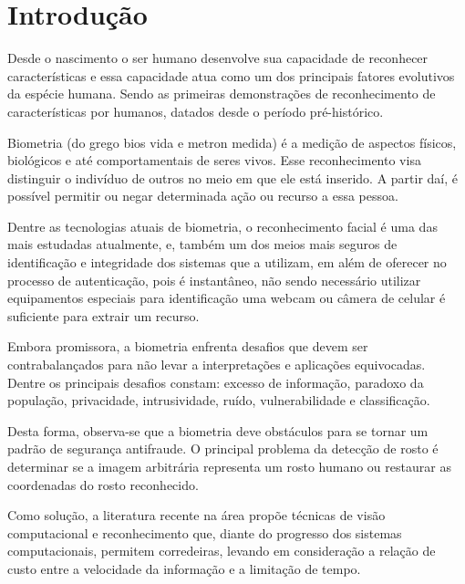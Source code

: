 
\chapter{Introdução}\label{cap:introducao}

Desde o nascimento o ser humano desenvolve sua capacidade de reconhecer características e essa capacidade atua como um dos principais fatores evolutivos da espécie humana. Sendo as primeiras demonstrações de reconhecimento de características por humanos, datados desde o período pré-histórico.

Biometria (do grego bios vida e metron medida) é a medição de aspectos físicos, biológicos e até comportamentais de seres vivos. Esse reconhecimento visa distinguir o indivíduo de outros no meio em que ele está inserido. A partir daí, é possível permitir ou negar determinada ação ou recurso a essa pessoa.

Dentre as tecnologias atuais de biometria, o reconhecimento facial é uma das mais estudadas atualmente, e, também um dos meios mais seguros de identificação e integridade dos sistemas que a utilizam, em além de oferecer no processo de autenticação, pois é instantâneo, não sendo necessário utilizar equipamentos especiais para identificação uma webcam ou câmera de celular é suficiente para extrair um recurso.

Embora promissora, a biometria enfrenta desafios que devem ser contrabalançados para não levar a interpretações e aplicações equivocadas. Dentre os principais desafios constam: excesso de informação, paradoxo da população, privacidade, intrusividade, ruído, vulnerabilidade e classificação.

Desta forma, observa-se que a biometria deve obstáculos para se tornar um padrão de segurança antifraude. O principal problema da detecção de rosto é determinar se a imagem arbitrária representa um rosto humano ou restaurar as coordenadas do rosto reconhecido.

Como solução, a literatura recente na área propõe técnicas de visão computacional e reconhecimento que, diante do progresso dos sistemas computacionais, permitem corredeiras, levando em consideração a relação de custo entre a velocidade da informação e a limitação de tempo.

